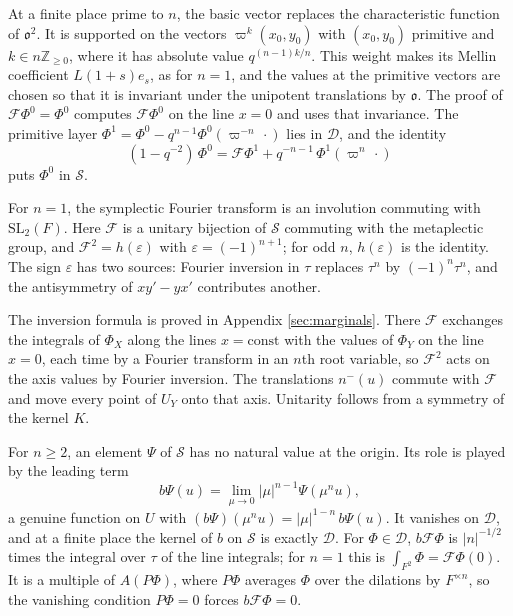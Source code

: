 
\begin{sketch}
  At a finite place prime to $n$, the basic vector replaces the characteristic function of $\mathfrak{o}^2$.  It is supported on the vectors $\varpi^k (x_0, y_0)$ with $(x_0, y_0)$ primitive and $k \in n \mathbb{Z}_{\geq 0}$, where it has absolute value $q^{(n-1) k / n}$.  This weight makes its Mellin coefficient $L(1 + s) e_s$, as for $n = 1$, and the values at the primitive vectors are chosen so that it is invariant under the unipotent translations by $\mathfrak{o}$.  The proof of $\mathcal{F} \Phi^0 = \Phi^0$ computes $\mathcal{F} \Phi^0$ on the line $x = 0$ and uses that invariance.  The primitive layer $\Phi^1 = \Phi^0 - q^{n-1} \Phi^0(\varpi^{-n} \, \cdot)$ lies in $\mathcal{D}$, and the identity
  \[
    (1 - q^{-2}) \, \Phi^0 = \mathcal{F} \Phi^1 + q^{-n-1} \, \Phi^1(\varpi^n \, \cdot)
  \]
  puts $\Phi^0$ in $\mathcal{S}$.
\end{sketch}


\begin{sketch}
  For $n = 1$, the symplectic Fourier transform is an involution commuting with $\mathrm{SL}_2(F)$.  Here $\mathcal{F}$ is a unitary bijection of $\mathcal{S}$ commuting with the metaplectic group, and $\mathcal{F}^2 = h(\varepsilon)$ with $\varepsilon = (-1)^{n+1}$; for odd $n$, $h(\varepsilon)$ is the identity.  The sign $\varepsilon$ has two sources: Fourier inversion in $\tau$ replaces $\tau^n$ by $(-1)^n \tau^n$, and the antisymmetry of $x y' - y x'$ contributes another.

  The inversion formula is proved in Appendix \ref{sec:marginals}.  There $\mathcal{F}$ exchanges the integrals of $\Phi_X$ along the lines $x = \mathrm{const}$ with the values of $\Phi_Y$ on the line $x = 0$, each time by a Fourier transform in an $n$th root variable, so $\mathcal{F}^2$ acts on the axis values by Fourier inversion.  The translations $n^-(u)$ commute with $\mathcal{F}$ and move every point of $U_Y$ onto that axis.  Unitarity follows from a symmetry of the kernel $K$.
\end{sketch}


\begin{sketch}
  For $n \geq 2$, an element $\Psi$ of $\mathcal{S}$ has no natural value at the origin.  Its role is played by the leading term
  \[
    b \Psi(u) = \lim_{\mu \to 0} \lvert \mu \rvert^{n-1} \Psi(\mu^n u),
  \]
  a genuine function on $U$ with $(b \Psi)(\mu^n u) = \lvert \mu \rvert^{1-n} \, b \Psi(u)$.  It vanishes on $\mathcal{D}$, and at a finite place the kernel of $b$ on $\mathcal{S}$ is exactly $\mathcal{D}$.  For $\Phi \in \mathcal{D}$, $b \mathcal{F} \Phi$ is $\lvert n \rvert^{-1/2}$ times the integral over $\tau$ of the line integrals; for $n = 1$ this is $\int_{F^2} \Phi = \mathcal{F} \Phi(0)$.  It is a multiple of $A(P \Phi)$, where $P \Phi$ averages $\Phi$ over the dilations by $F^{\times n}$, so the vanishing condition $P \Phi = 0$ forces $b \mathcal{F} \Phi = 0$.
\end{sketch}

